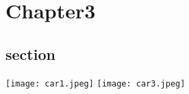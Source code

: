 \documentclass[../Lat-Book/Lat-Book.tex]{subfiles}
\begin{document}
\INIT

\chapter{Chapter3}

\section{section}
\texttt{[image: car1.jpeg]}
\texttt{[image: car3.jpeg]}
\end{document}
